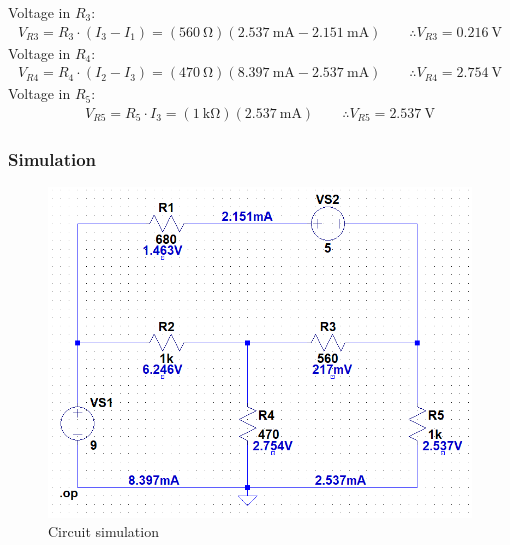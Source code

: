 \documentclass[letterpaper]{article}
\begin{document}
Voltage in $R_3$:
\begin{gather*}V_{R3} = R_3\cdot(I_3-I_1)
    =(\SI{560}{\ohm})(\SI{2.537}{\milli\ampere}-\SI{2.151}{\milli\ampere})\qquad\therefore V_{R3} =
\SI{0.216}{\volt}
\end{gather*}
Voltage in $R_4$:
\begin{gather*}V_{R4} = R_4\cdot(I_2-I_3)
    =(\SI{470}{\ohm})(\SI{8.397}{\milli\ampere}-\SI{2.537}{\milli\ampere})\qquad\therefore V_{R4} =
\SI{2.754}{\volt}
\end{gather*}
Voltage in $R_5$:
\begin{gather*}V_{R5} = R_5\cdot I_3
    =(\SI{1}{\kilo\ohm})(\SI{2.537}{\milli\ampere})\qquad\therefore V_{R5} =
\SI{2.537}{\volt}
\end{gather*}
\subsubsection{Simulation}
\begin{figure}[H]
    \centering
    \includegraphics[width=.65\linewidth]{sim1}
    \caption{Circuit simulation}
\end{figure}
\end{document}
